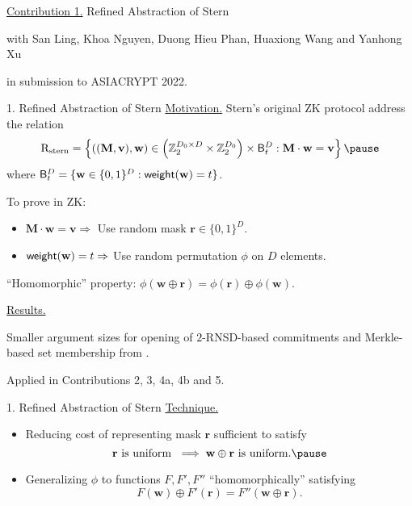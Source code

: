 \begin{frame}{}
	\underline{Contribution 1.} Refined Abstraction of Stern
	
	{\small with San Ling, Khoa Nguyen, Duong Hieu Phan, Huaxiong Wang and Yanhong Xu}
	
	in submission to ASIACRYPT 2022.
\end{frame}

\begin{frame}{1. Refined Abstraction of Stern}
	\underline{Motivation.} Stern's original ZK protocol address the relation \pause
	\begin{equation*}
		\RelationStern = \left\{((\mathbf{M},\mathbf{v}), \mathbf{w}) \in \left(\mathbb{Z}_2^{D_0\times D}\times \mathbb{Z}_2^{D_0}\right)\times \FixedWeightSet^D_t : \mathbf{M}\cdot\mathbf{w} = \mathbf{v}\right\}\pause
	\end{equation*}
	where $\mathsf{B}^D_t = \{\mathbf{w} \in \{0,1\}^D : \mathsf{weight}(\mathbf{w}) = t\}$.\pause
	
	To prove in ZK:\pause
	\begin{itemize}
			\item $\mathbf{M}\cdot\mathbf{w} =\mathbf{v} \Rightarrow$ Use random mask $\mathbf{r} \in \{0,1\}^D$.\pause
			\item $\mathsf{weight}(\mathbf{w}) = t \Rightarrow$ Use random permutation $\phi$ on $D$ elements.\pause
	\end{itemize}
	
	``Homomorphic'' property: $\phi(\mathbf{w} \oplus \mathbf{r}) = \phi(\mathbf{r}) \oplus \phi(\mathbf{w})$.\pause
	
	\underline{Results.}\pause
	
	Smaller argument sizes for opening of $2$-RNSD-based commitments and Merkle-based set membership from \cite{NguyenTWZ19}.\pause
	
	Applied in Contributions 2, 3, 4a, 4b and 5.
\end{frame}

\begin{frame}{1. Refined Abstraction of Stern}
	\underline{Technique.}\pause
	\begin{itemize}
		\item Reducing cost of representing mask $\mathbf{r}$ sufficient to satisfy \pause
		\begin{equation*}
			\mathbf{r} \text{ is uniform } \implies \mathbf{w} \oplus \mathbf{r} \text{ is uniform.}\pause
		\end{equation*}  
		\item Generalizing $\phi$ to functions $F, F', F''$ ``homomorphically'' satisfying\pause
		\begin{equation*}
			F(\mathbf{w}) \oplus F'(\mathbf{r}) = F''(\mathbf{w} \oplus \mathbf{r}).
		\end{equation*}
	\end{itemize}
\end{frame}